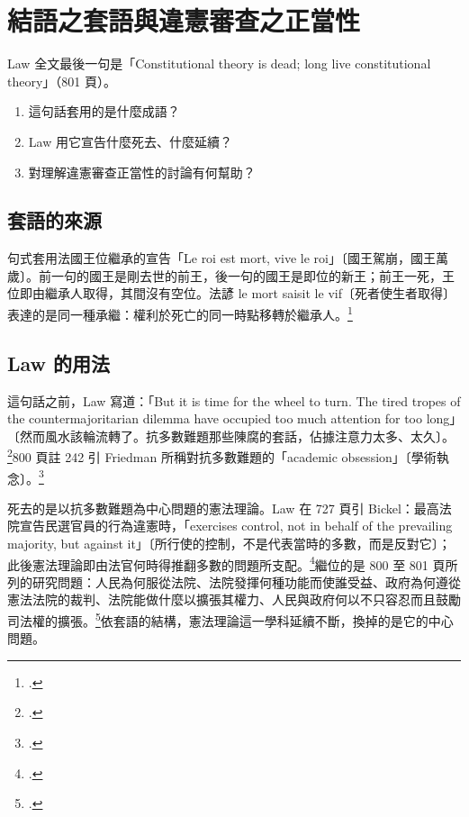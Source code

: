 \chapter{結語之套語與違憲審查之正當性}
\label{ch:50_theory}

\begin{qaquestion}
Law 全文最後一句是「Constitutional theory is dead; long live constitutional theory」（801 頁）。
\begin{enumerate}
\tightlist
\item 這句話套用的是什麼成語？
\item Law 用它宣告什麼死去、什麼延續？
\item 對理解違憲審查正當性的討論有何幫助？
\end{enumerate}
\end{qaquestion}

\section{套語的來源}
\label{sec:50_theory-1}

句式套用法國王位繼承的宣告「Le roi est mort, vive le roi」〔國王駕崩，國王萬歲〕。前一句的國王是剛去世的前王，後一句的國王是即位的新王；前王一死，王位即由繼承人取得，其間沒有空位。法諺 le mort saisit le vif〔死者使生者取得〕表達的是同一種承繼：權利於死亡的同一時點移轉於繼承人。\footcite{wiki-roi}

\section{Law 的用法}
\label{sec:50_theory-2}

這句話之前，Law 寫道：「But it is time for the wheel to turn. The tired tropes of the countermajoritarian dilemma have occupied too much attention for too long」〔然而風水該輪流轉了。抗多數難題那些陳腐的套話，佔據注意力太多、太久〕。\footcite[801]{law2009}800 頁註 242 引 Friedman 所稱對抗多數難題的「academic obsession」〔學術執念〕。\footcite[800 n.242]{law2009}

死去的是以抗多數難題為中心問題的憲法理論。Law 在 727 頁引 Bickel：最高法院宣告民選官員的行為違憲時，「exercises control, not in behalf of the prevailing majority, but against it」〔所行使的控制，不是代表當時的多數，而是反對它〕；此後憲法理論即由法官何時得推翻多數的問題所支配。\footcite[727]{law2009}繼位的是 800 至 801 頁所列的研究問題：人民為何服從法院、法院發揮何種功能而使誰受益、政府為何遵從憲法法院的裁判、法院能做什麼以擴張其權力、人民與政府何以不只容忍而且鼓勵司法權的擴張。\footcite[800--801]{law2009}依套語的結構，憲法理論這一學科延續不斷，換掉的是它的中心問題。


